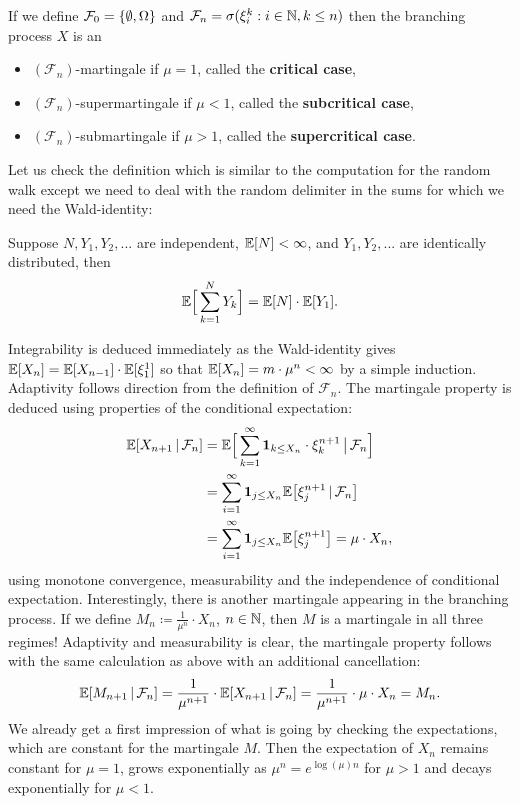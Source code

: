 \begin{example}
	 If we define $\mathcal{F}_0 = \lbrace \emptyset,\Omega \rbrace$ and $\mathcal{F}_n = \sigma(\xi_i^k: i\in \mathbb{N},k\leq n)$ then the branching process $X$ is an
			\begin{itemize}
				\item
					$(\mathcal F_n)$-martingale if $\mu=1$, called the \textbf{critical case},
				\item
					$(\mathcal F_n)$-supermartingale if $\mu<1$, called the \textbf{subcritical case},
				\item
					$(\mathcal F_n)$-submartingale if $\mu>1$, called the \textbf{supercritical case}.
			\end{itemize}
	Let us check the definition which is similar to the computation for the random walk except we need to deal with the random delimiter in the sums for which we need the Wald-identity:
	\begin{luebung}
		Suppose $N, Y_1,Y_2,...$ are independent, $\mathbb{E}[N]<\infty$, and $Y_1,Y_2,...$ are identically distributed, then
		\begin{align}\label{Wald}
			\mathbb{E}\Big[\sum_{k=1}^N Y_k\Big]=\mathbb{E}[N]\cdot \mathbb{E}[Y_1].
		\end{align}
	\end{luebung}
	Integrability is deduced immediately as the Wald-identity gives $\mathbb{E}[X_n]=\mathbb{E}[X_{n-1}]\cdot \mathbb{E}[\xi_1^1]$ so that $\mathbb{E}[X_n]=m\cdot\mu^{n}<\infty$ by a simple induction. Adaptivity follows direction from the definition of $\mathcal F_n$. The martingale property is deduced using properties of the conditional expectation:
			\begin{align*}
				\mathbb{E}[X_{n+1}\,|\,\mathcal{F}_n] &= \mathbb{E}\Big[ \sum_{k=1}^{\infty}\mathbf 1_{k \leq X_n}\cdot \xi_k^{n+1}\,\big|\,\mathcal{F}_n\Big] \\
										&=\sum_{i=1}^{\infty}\mathbf 1_{j \leq X_n} \mathbb{E}\big[\xi_j^{n+1}\,|\,\mathcal{F}_n\big] \\
										&=\sum_{i=1}^{\infty}\mathbf 1_{j \leq X_n} \mathbb{E}\big[\xi_j^{n+1}\big] 
										=\mu \cdot X_n,
			\end{align*}
			using monotone convergence, measurability and the independence of conditional expectation. Interestingly, there is another martingale appearing in the branching process. If we define $M_n \coloneqq \frac{1}{\mu^n}\cdot X_n$, $n\in\mathbb{N}$, then $M$ is a martingale in all three regimes! Adaptivity and measurability is clear, the martingale property follows with the same calculation as above with an additional cancellation:			
			$$ \mathbb{E}[M_{n+1}\,|\,\mathcal{F}_n] = \frac{1}{\mu^{n+1}}\cdot \mathbb{E}[X_{n+1}\,|\,\mathcal{F}_n] = \frac{1}{\mu^{n+1}} \cdot \mu \cdot X_n = M_n.$$
			We already get a first impression of what is going by checking the expectations, which are constant for the martingale $M$. Then the expectation of $X_n$ remains constant for $\mu=1$, grows exponentially as $\mu^n=e^{\log(\mu)n}$ for $\mu>1$ and decays exponentially for $\mu<1$.
		\end{example}

